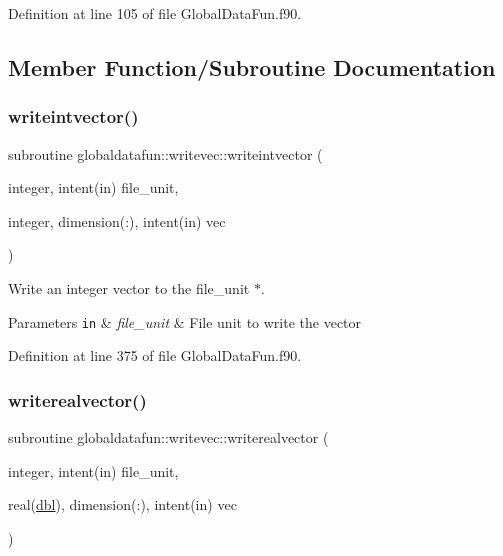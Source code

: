 Definition at line 105 of file Global\+Data\+Fun.\+f90.



\subsection{Member Function/\+Subroutine Documentation}
\mbox{\label{interfaceglobaldatafun_1_1writevec_acaa8979c629439920cf2fcd8dc39652d}} 
\subsubsection{\texorpdfstring{writeintvector()}{writeintvector()}}
{\footnotesize\ttfamily subroutine globaldatafun\+::writevec\+::writeintvector (\begin{DoxyParamCaption}\item[{integer, intent(in)}]{file\+\_\+unit,  }\item[{integer, dimension(\+:), intent(in)}]{vec }\end{DoxyParamCaption})\hspace{0.3cm}{\ttfamily [private]}}



Write an integer vector to the file\+\_\+unit $\ast$. 


\begin{DoxyParams}[1]{Parameters}
\mbox{\tt in}  & {\em file\+\_\+unit} & File unit to write the vector \\
\hline
\end{DoxyParams}


Definition at line 375 of file Global\+Data\+Fun.\+f90.

\mbox{\label{interfaceglobaldatafun_1_1writevec_a64fd9ea2d0b1776a2844c65a2e7ffac9}} 
\subsubsection{\texorpdfstring{writerealvector()}{writerealvector()}}
{\footnotesize\ttfamily subroutine globaldatafun\+::writevec\+::writerealvector (\begin{DoxyParamCaption}\item[{integer, intent(in)}]{file\+\_\+unit,  }\item[{real(\hyperlink{namespaceglobaldatafun_a5008801201dd34f2af8eae07756befb4}{dbl}), dimension(\+:), intent(in)}]{vec }\end{DoxyParamCaption})\hspace{0.3cm}{\ttfamily [private]}}



